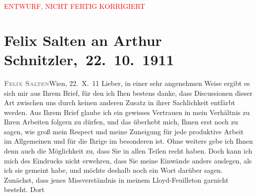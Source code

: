 
\begin{center}
            \textcolor{red}{ENTWURF, NICHT FERTIG KORRIGIERT}
                      \end{center}
            
         
         \renewcommand{\erwaehntePersonen}{Personen: Felix Salten, Ottilie Salten, Olga Schnitzler}
         \renewcommand{\erwaehnteOrte}{Orte: Berlin, Wien}
         \renewcommand{\erwaehnteWerke}{Werke: Burgtheater. »Das weite Land.« Tragikomödie von Arthur Schnitzler, Das weite Land. Tragikomödie in fünf Akten, Der gute König Dagobert. Lustspiel in vier Aufzügen}
               \section[ Felix Salten an Arthur Schnitzler, 22. 10. 1911]{ Felix Salten an Arthur Schnitzler, 22. 10. 1911}\nopagebreak{}\rehead{ }\begin{ledgroupsized}[t]{13cm}\normalsize\beginnumbering \toendnotes[C]{\smallbreak\pagebreak[2]} 
\toendnotes[C]{\smallbreak}\pstart
           \noindent{}{\pb}\textcolor{gray}{\textbf{\textsc{Felix Salten}}}\hfill Wien, 22. X. 11\pend
           \pstart
           Lieber, in einer sehr angenehmen Weise ergibt es sich mir aus Ihrem
               Brief, für den ich Ihen bestens danke, dass Discussionen dieser Art zwischen uns
               durch keinen anderen Zusatz in ihrer Sachlichkeit entfärbt werden. Aus Ihrem Brief
               glaube ich ein gewisses Vertrauen in mein Verhältnis zu Ihren Arbeiten folgern zu
               dürfen, und das überhebt mich, Ihnen erst noch zu sagen, wie groß mein Respect und
               meine Zuneigung für jede produktive Arbeit im Allgemeinen und für die Ihrige im
               besonderen ist. Ohne weiters gebe ich Ihnen denn auch die Möglichkeit zu, dass Sie in
               allen Teilen recht haben. Doch kann ich mich des Eindrucks nicht erwehren, dass Sie
               meine Einwände anders auslegen, als ich sie gemeint habe, und möchte deshalb noch ein
               Wort darüber sagen. Zunächst, dass jenes Missverständnis in meinem Lloyd-Feuilleton garnicht besteht. Dort

\end{ledgroupsized}
